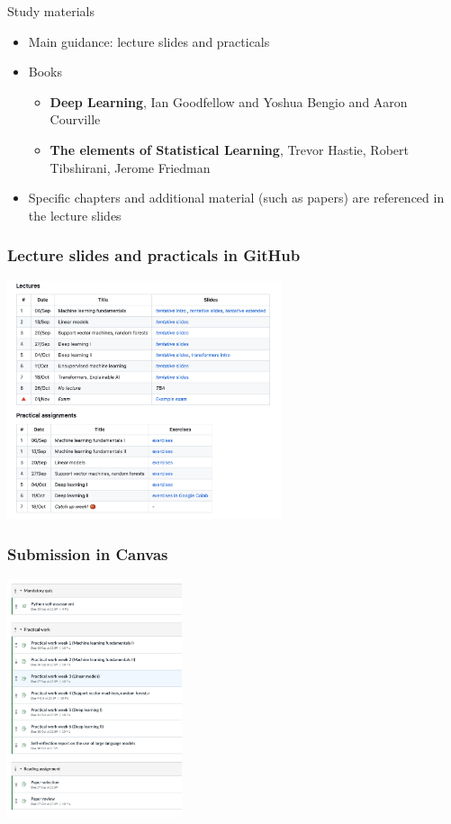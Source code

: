 \documentclass[notes]{beamer}          %
\begin{document}
\begin{frame}{Study materials}
\begin{itemize}
\item Main guidance: lecture slides and practicals
\item Books
\begin{itemize}
    \item \textbf{Deep Learning}, Ian Goodfellow and Yoshua Bengio and Aaron Courville
    \item \textbf{The elements of Statistical Learning}, Trevor Hastie, Robert Tibshirani, Jerome Friedman
\end{itemize}
\item Specific chapters and additional material (such as papers) are referenced in the lecture slides
\end{itemize}
\end{frame}


\begin{frame}
\frametitle{Lecture slides and practicals in GitHub}
\begin{center}
\includegraphics[height=7cm]{../figures/intro/materials_github.png}
\end{center}
\end{frame}


\begin{frame}
\frametitle{Submission in Canvas}
\begin{center}
\includegraphics[height=7cm]{../figures/intro/all_assignments.png}
\end{center}
\end{frame}
\end{document}
